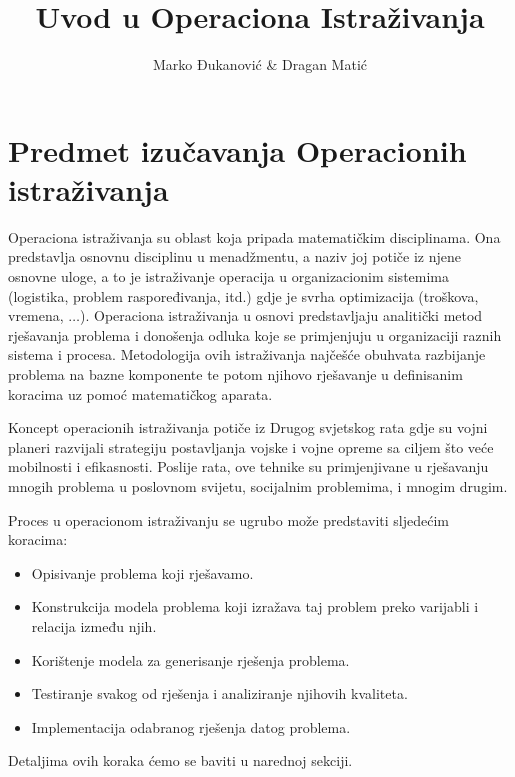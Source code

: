 \documentclass[a4paper, utf8, 11pt, colorlinks]{book}
\author{
 Marko Đukanović  \& Dragan Matić
}
\title{Uvod u Operaciona Istraživanja}
\begin{document}
\maketitle
\newpage
\tableofcontents

\newpage

\chapter{Predmet izučavanja Operacionih istraživanja}

Operaciona istraživanja su oblast koja pripada matematičkim disciplinama. Ona predstavlja osnovnu disciplinu u menadžmentu, a naziv joj potiče iz njene osnovne uloge, a to je istraživanje  operacija u organizacionim sistemima (logistika, problem raspoređivanja, itd.) gdje je svrha optimizacija (troškova, vremena, $\ldots$). Operaciona istraživanja u osnovi predstavljaju analitički metod rješavanja problema i donošenja odluka koje se primjenjuju u organizaciji raznih sistema i procesa. Metodologija ovih istraživanja  najčešće obuhvata razbijanje problema na bazne komponente te potom njihovo rješavanje u definisanim koracima uz pomoć matematičkog aparata. 

Koncept operacionih istraživanja potiče iz Drugog svjetskog rata gdje su vojni planeri razvijali strategiju postavljanja vojske i vojne opreme sa ciljem što veće mobilnosti i efikasnosti. Poslije rata, ove tehnike su primjenjivane u rješavanju mnogih problema u poslovnom svijetu, socijalnim problemima, i mnogim drugim. 

Proces u operacionom istraživanju se ugrubo može predstaviti sljedećim koracima:
\begin{itemize}
    \item Opisivanje problema koji rješavamo.
    \item Konstrukcija modela problema koji izražava taj problem preko varijabli i relacija između njih. 
    \item Korištenje modela za generisanje rješenja problema.
    \item Testiranje svakog od rješenja i analiziranje njihovih  kvaliteta.
    \item Implementacija odabranog rješenja datog problema. 
\end{itemize}
Detaljima ovih koraka ćemo se baviti  u narednoj sekciji.
 
\end{document}
